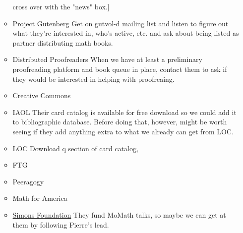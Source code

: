 \begin{itemize}
\begin{itemize}
    cross over with the "news" box.]
  \item Project Gutenberg
  Get on gutvol-d mailing list and listen to figure out what they're interested in,
  who's active, etc. and ask about being listed as partner distributing math books.
  \item Distributed Proofreaders
  When we have at least a preliminary proofreading platform and book queue in place,
  contact them to ask if they would be interested in helping with proofreaing.
  \item Creative Commons
  \item IAOL
  Their card catalog is available for free download so we could add it to bibliographic
  database.  Before doing that, however, might be worth seeing if they add anything 
  extra to what we already can get from LOC.
  \item LOC
  Download q section of card catalog,
  \item FTG
  \item Peeragogy
  \item Math for America
  \item \href{https://simonsfoundation.org/}{Simons Foundation}
  They fund MoMath talks, so maybe we can get at them by
  following Pierre's lead.
  \end{itemize}
\end{itemize}

